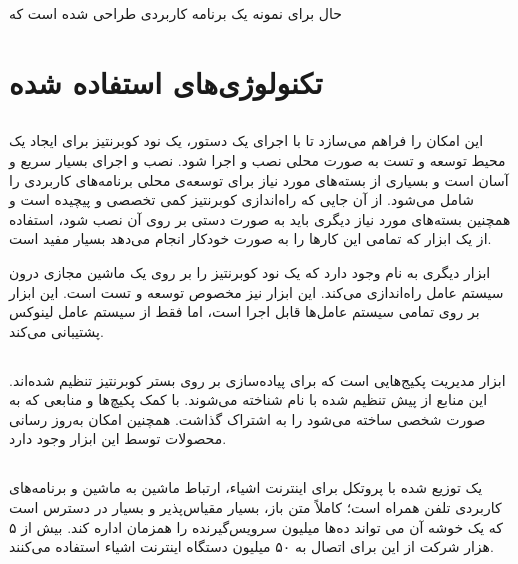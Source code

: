 حال برای نمونه یک برنامه کاربردی طراحی شده است که

\newpage

\section{تکنولوژی‌های استفاده شده}

\subsection{}

 این امکان را فراهم می‌سازد تا با اجرای یک دستور، یک نود کوبرنتیز برای ایجاد یک محیط توسعه و تست به صورت محلی نصب و اجرا شود. نصب و اجرای  بسیار سریع و آسان است و بسیاری از بسته‌های مورد نیاز برای توسعه‌ی محلی برنامه‌های کاربردی را شامل می‌شود. از آن جایی که راه‌اندازی کوبرنتیز کمی تخصصی و پیچیده است و همچنین بسته‌های مورد نیاز دیگری باید به صورت دستی بر روی آن نصب شود، استفاده از یک ابزار که تمامی این کارها را به صورت خودکار انجام می‌دهد بسیار مفید است.
\cite{microk8s}

ابزار دیگری به نام  وجود دارد که یک نود کوبرنتیز را بر روی یک ماشین مجازی درون سیستم عامل راه‌اندازی می‌کند. این ابزار نیز مخصوص توسعه و تست است. این ابزار بر روی تمامی سیستم عامل‌ها قابل اجرا است، اما  فقط از سیستم عامل لینوکس پشتیبانی می‌کند.
\cite{minikube}

\subsection{}

ابزار مدیریت پکیج‌هایی است که برای پیاده‌سازی بر روی بستر کوبرنتیز تنظیم شده‌اند. این منابع از پیش تنظیم شده با نام  شناخته می‌شوند. با کمک  پکیچ‌ها و منابعی که به صورت شخصی ساخته می‌شود را به اشتراک گذاشت. همچنین امکان به‌روز رسانی محصولات توسط این ابزار وجود دارد. 	
\cite{helm}

\subsection{}

 یک  توزیع شده با پروتکل  برای اینترنت اشیاء، ارتباط ماشین به ماشین و برنامه‌های کاربردی تلفن همراه است؛ کاملاً متن باز، بسیار مقیاس‌پذیر و بسیار در دسترس است که یک خوشه آن می تواند ده‌ها میلیون سرویس‌گیرنده را همزمان اداره کند. بیش از ۵ هزار شرکت از این  برای اتصال به ۵۰ میلیون دستگاه اینترنت اشیاء استفاده می‌کنند.
\cite{emqx}

